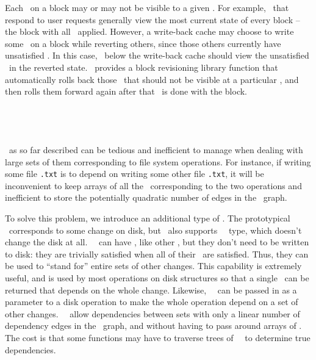 Each \chdesc\ on a block may or may not be visible to a given \module. For
example, \modules\ that respond to user requests generally view the most current
state of every block -- the block with all \chdescs\ applied. However, a
write-back cache may choose to write some \chdescs\ on a block while reverting
others, since those others currently have unsatisfied \befores. In this case,
\modules\ below the write-back cache should view the unsatisfied \chdescs\ in
the reverted state.
%
\Kudos\ provides a block revisioning library function that automatically rolls
back those \chdescs\ that should not be visible at a particular \module, and
then rolls them forward again after that \module\ is done with the block.

\subsection{\Noop\ \ChDescs}
\label{sec:chdescs:noop}
\Chdescs\ as so far described can be tedious and inefficient to manage when
dealing with large sets of them corresponding to file system operations. For
instance, if writing some file \texttt{\after.txt} is to depend on writing some
other file \texttt{\before.txt}, it will be inconvenient to keep arrays of all
the \chdescs\ corresponding to the two operations and inefficient to store the
potentially quadratic number of edges in the \chdesc\ graph.

To solve this problem, we introduce an additional type of \chdesc. The
prototypical \chdesc\ corresponds to some change on disk, but \Kudos\ also
supports \aemphnoop\ \chdesc\ type, which doesn't change the disk at all.
\Noop\ \chdescs\ can have \befores, like other \chdescs, but they don't need to
be written to disk: they are trivially satisfied when all of their \befores\ are
satisfied. Thus, they can be used to ``stand for'' entire sets of other changes.
%
This capability is extremely useful, and is used by most operations on disk
structures so that a single \chdesc\ can be returned that depends on the whole
change. Likewise, \anoop\ \chdesc\ can be passed in as a parameter to a disk
operation to make the whole operation depend on a set of other changes. \Noop\
\chdescs\ allow dependencies between sets with only a linear number of
dependency edges in the \chdesc\ graph, and without having to pass around arrays
of \chdescs.
%
The cost is that some functions may have to traverse trees of \noop\ \chdescs\
to determine true dependencies.
%


